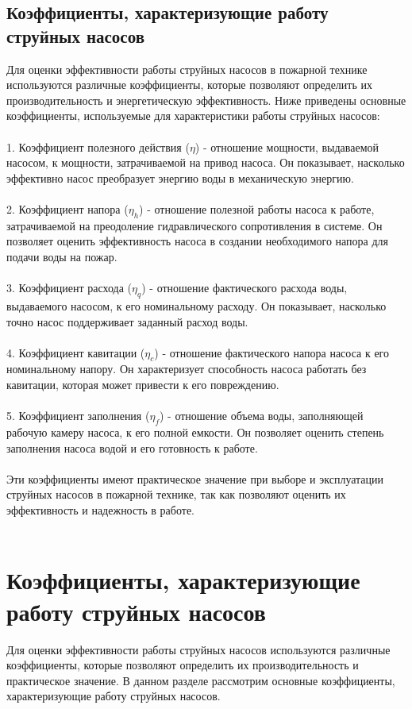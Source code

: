 \documentclass{article}
\begin{document}
\subsection{Коэффициенты, характеризующие работу струйных насосов}
Для оценки эффективности работы струйных насосов в пожарной технике используются различные коэффициенты, которые позволяют определить их производительность и энергетическую эффективность. Ниже приведены основные коэффициенты, используемые для характеристики работы струйных насосов:\\
~\\
1. Коэффициент полезного действия ($\eta$) - отношение мощности, выдаваемой насосом, к мощности, затрачиваемой на привод насоса. Он показывает, насколько эффективно насос преобразует энергию воды в механическую энергию.\\
~\\
2. Коэффициент напора ($\eta_h$) - отношение полезной работы насоса к работе, затрачиваемой на преодоление гидравлического сопротивления в системе. Он позволяет оценить эффективность насоса в создании необходимого напора для подачи воды на пожар.\\
~\\
3. Коэффициент расхода ($\eta_q$) - отношение фактического расхода воды, выдаваемого насосом, к его номинальному расходу. Он показывает, насколько точно насос поддерживает заданный расход воды.\\
~\\
4. Коэффициент кавитации ($\eta_c$) - отношение фактического напора насоса к его номинальному напору. Он характеризует способность насоса работать без кавитации, которая может привести к его повреждению.\\
~\\
5. Коэффициент заполнения ($\eta_f$) - отношение объема воды, заполняющей рабочую камеру насоса, к его полной емкости. Он позволяет оценить степень заполнения насоса водой и его готовность к работе.\\
~\\
Эти коэффициенты имеют практическое значение при выборе и эксплуатации струйных насосов в пожарной технике, так как позволяют оценить их эффективность и надежность в работе.\\
~\\

\newpage
\section{Коэффициенты, характеризующие работу струйных насосов}
Для оценки эффективности работы струйных насосов используются различные коэффициенты, которые позволяют определить их производительность и практическое значение. В данном разделе рассмотрим основные коэффициенты, характеризующие работу струйных насосов.
\end{document}
